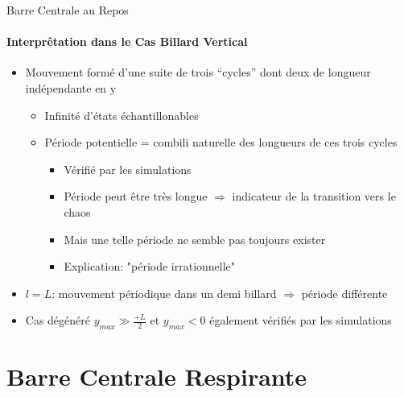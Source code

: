 \documentclass{beamer}
\begin{document}
  \begin{frame}{Barre Centrale au Repos}
  \framesubtitle{Interprêtation dans le Cas Billard Vertical}
  \begin{itemize}
    \item Mouvement formé d'une suite de trois ``cycles'' dont deux de longueur indépendante en y
    \begin{itemize}
      \item Infinité d'états échantillonables
      \item Période potentielle = combili naturelle des longueurs de ces trois cycles
      \begin{itemize}
        \item Vérifié par les simulations
        \item Période peut être très longue \(\Rightarrow\) indicateur de la transition vers le chaos
        \item Mais une telle période ne semble pas toujours exister
        \item Explication: "période irrationnelle"
      \end{itemize}
    \end{itemize}
    \item \(l=L\): mouvement périodique dans un demi billard \(\Rightarrow\) période différente 
    \item Cas dégénéré \(y_{max} \gg \frac{+L}{2}\) et \( y_{max}<0 \) également vérifiés par les simulations
  \end{itemize}
  \end{frame}

  \section{Barre Centrale Respirante}
  
\end{document}
